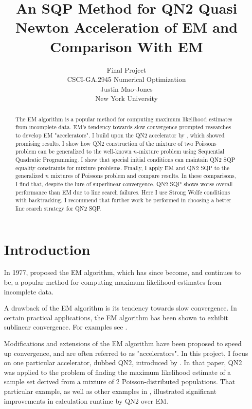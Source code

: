 \documentclass[letter,12pt]{article}
\begin{document}
\title{An SQP Method for QN2 Quasi Newton Acceleration of EM and Comparison With EM}
\author{Final Project\\CSCI-GA.2945 Numerical Optimization\\Justin Mao-Jones\\New York University}
\renewcommand{\today}{December 14, 2014}
\maketitle

\begin{abstract}
The EM algorithm is a popular method for computing maximum likelihood estimates from incomplete data.  EM's tendency towards slow convergence prompted researches to develop EM "accelerators".  I build upon the QN2 accelerator by \cite{jamshidianj97}, which showed promising results. I show how QN2 construction of the mixture of two Poissons problem can be generalized to the well-known $n$-mixture problem using Sequential Quadratic Programming.  I show that special initial conditions can maintain QN2 SQP equality constraints for mixture problems.  Finally, I apply EM and QN2 SQP to the generalized $n$ mixtures of Poissons problem and compare results.  In these comparisons, I find that, despite the lure of superlinear convergence, QN2 SQP shows worse overall performance than EM due to line search failures.  Here I use Strong Wolfe conditions with backtracking.  I recommend that further work be performed in choosing a better line search strategy for QN2 SQP.
\end{abstract}

\section{Introduction}

In 1977, \citeauthor*{dempsterlr77} proposed the EM algorithm, which has since become, and continues to be, a popular method for computing maximum likelihood estimates from incomplete data.  

A drawback of the EM algorithm is its tendency towards slow convergence.  In certain practical applications, the EM algorithm has been shown to exhibit sublinear convergence.  For examples see \cite{lange1995a,jamshidianj93,jamshidianj97}.

Modifications and extensions of the EM algorithm have been proposed to speed up convergence, and are often referred to as "accelerators".  In this project, I focus on one particular accelerator, dubbed QN2, introduced by \cite{jamshidianj97}.  In that paper, QN2 was applied to the problem of finding the maximum likelihood estimate of a sample set derived from a mixture of 2 Poisson-distributed populations.  That particular example, as well as other examples in \cite{jamshidianj97}, illustrated significant improvements in calculation runtime by QN2 over EM.
\end{document}

